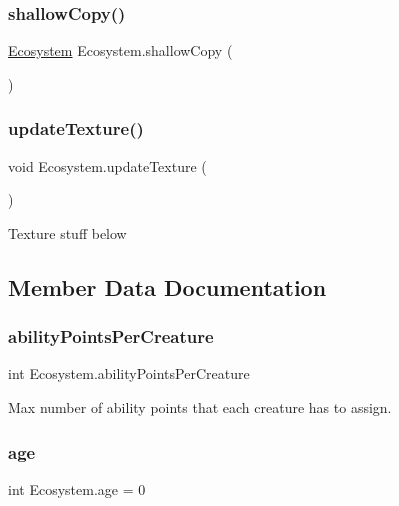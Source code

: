 \subsubsection{\texorpdfstring{shallow\+Copy()}{shallowCopy()}}
{\footnotesize\ttfamily \mbox{\hyperlink{class_ecosystem}{Ecosystem}} Ecosystem.\+shallow\+Copy (\begin{DoxyParamCaption}{ }\end{DoxyParamCaption})}

\mbox{\label{class_ecosystem_a24d493832618dbfccb61812635c2fbdf}} 
\subsubsection{\texorpdfstring{update\+Texture()}{updateTexture()}}
{\footnotesize\ttfamily void Ecosystem.\+update\+Texture (\begin{DoxyParamCaption}{ }\end{DoxyParamCaption})}

Texture stuff below 

\subsection{Member Data Documentation}
\mbox{\label{class_ecosystem_af1e2bcc0bc7096df0c326953813ca94d}} 
\subsubsection{\texorpdfstring{ability\+Points\+Per\+Creature}{abilityPointsPerCreature}}
{\footnotesize\ttfamily int Ecosystem.\+ability\+Points\+Per\+Creature}



Max number of ability points that each creature has to assign. 

\mbox{\label{class_ecosystem_aad967a97d8bc9886ad764bdb3c85a83a}} 
\subsubsection{\texorpdfstring{age}{age}}
{\footnotesize\ttfamily int Ecosystem.\+age = 0}

